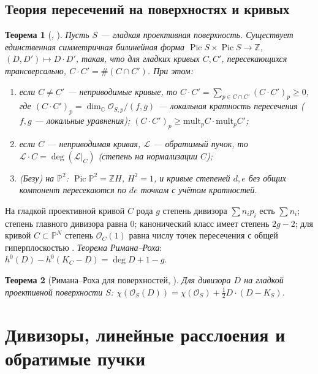 \documentclass[11pt,a4paper]{article}
\theoremstyle{plain}
\newtheorem{theorem}{Теорема}[section]
\theoremstyle{definition}
\theoremstyle{remark}
\renewcommand{\C}{\mathbb{C}}
\newcommand{\Z}{\mathbb{Z}}
\newcommand{\PP}{\mathbb{P}}
\newcommand{\cO}{\mathcal{O}}
\newcommand{\cL}{\mathcal{L}}
\DeclareMathOperator{\Pic}{Pic}
\begin{document}
\subsection{Теория пересечений на поверхностях и кривых}\label{ss:intersection}

\begin{theorem}[{\cite[V.1.1]{Ha}, \cite[I]{Be}}]\label{thm:intersection}
Пусть $S$ --- гладкая проективная поверхность. Существует единственная симметричная билинейная
форма $\Pic S\times\Pic S\to\Z$, $(D,D')\mapsto D\cdot D'$, такая, что для гладких кривых $C,C'$,
пересекающихся трансверсально, $C\cdot C'=\#(C\cap C')$. При этом:
\begin{enumerate}
\item если $C\neq C'$ --- неприводимые кривые, то $C\cdot C'=\sum_{p\in C\cap C'}(C\cdot C')_p\ge0$,
где $(C\cdot C')_p=\dim_\C\cO_{S,p}/(f,g)$ --- локальная кратность пересечения
($f,g$ --- локальные уравнения); $(C\cdot C')_p\ge \mathrm{mult}_p C\cdot\mathrm{mult}_p C'$;
\item если $C$ --- неприводимая кривая, $\cL$ --- обратимый пучок, то
$\cL\cdot C=\deg(\cL|_{C})$ (степень на нормализации $C$);
\item (Безу) на $\PP^2$: $\Pic\PP^2=\Z H$, $H^2=1$, и кривые степеней $d,e$ без общих компонент пересекаются по
$de$ точкам с учётом кратностей.
\end{enumerate}
\end{theorem}

На гладкой проективной кривой $C$ рода $g$ степень дивизора $\sum n_ip_i$ есть $\sum n_i$; степень
главного дивизора равна $0$; канонический класс имеет степень $2g-2$; для кривой $C\subset\PP^N$
степень $\cO_C(1)$ равна числу точек пересечения с общей гиперплоскостью
\cite[IV.1]{Ha}. \emph{Теорема Римана--Роха}: $h^0(D)-h^0(K_C-D)=\deg D+1-g$.

\begin{theorem}[{Римана--Роха для поверхностей, \cite[V.1.6]{Ha}}]\label{thm:RR}
Для дивизора $D$ на гладкой проективной поверхности $S$:
$\chi(\cO_S(D))=\chi(\cO_S)+\tfrac12 D\cdot(D-K_S)$.
\end{theorem}

\section{Дивизоры, линейные расслоения и обратимые пучки}\label{sec:div}
\end{document}
